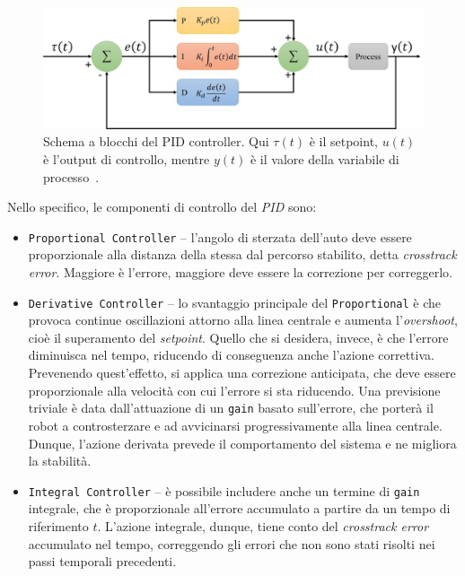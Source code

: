 \begin{figure}[H]
    \centering
    \includegraphics[width=\textwidth]{images/PID_controller.jpg}
    \caption{Schema a blocchi del PID controller. Qui $\tau(t)$ è il setpoint, $u(t)$ è l'output di controllo, mentre $y(t)$ è il valore della variabile di processo~\cite{pidimg}.}
    \label{fig:fig7} %
\end{figure}
Nello specifico, le componenti di controllo del \textit{PID} sono:
\begin{itemize}
    \item \verb|Proportional Controller| -- l'angolo di sterzata dell'auto deve essere proporzionale 
    alla distanza della stessa dal percorso stabilito, detta \textit{crosstrack error}. 
    Maggiore è l’errore, maggiore deve essere la correzione per correggerlo.
    \item \verb|Derivative Controller| -- lo svantaggio principale del \verb|Proportional|
    è che provoca continue oscillazioni attorno alla linea centrale e aumenta 
    l'\textit{overshoot}, cioè il superamento del \textit{setpoint}. 
    Quello che si desidera, invece, è che l'errore diminuisca nel tempo, riducendo di 
    conseguenza anche l'azione correttiva.
    Prevenendo quest'effetto, si applica una correzione anticipata, che deve essere
    proporzionale alla velocità con cui l’errore si sta riducendo.
    Una previsione triviale è data dall’attuazione di un \verb|gain| basato sull’errore, che
    porterà il robot a controsterzare e ad avvicinarsi progressivamente alla linea centrale. 
    Dunque, l'azione derivata prevede il comportamento del sistema e ne migliora la stabilità.
    \item \verb|Integral Controller| -- è possibile includere anche un termine di 
    \verb|gain| integrale, che è proporzionale all’errore accumulato a partire da un tempo
    di riferimento $t$. L'azione integrale, dunque, tiene conto del \textit{crosstrack error} 
    accumulato nel tempo, correggendo gli errori che non sono stati risolti nei passi temporali precedenti.
\end{itemize}
